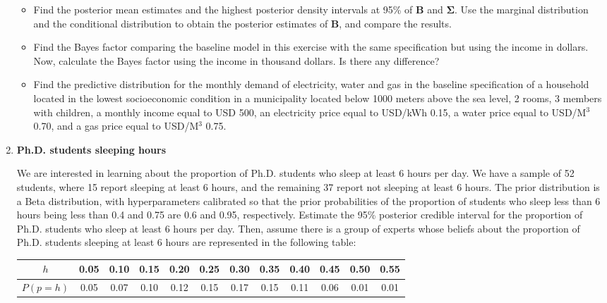 \begin{enumerate}
\begin{itemize}
	\item Find the posterior mean estimates and the highest posterior density intervals at 95\% of $\bm{B}$ and $\bm{\Sigma}$. Use the marginal distribution and the conditional distribution to obtain the posterior estimates of  $\bm{B}$, and compare the results.
	\item Find the Bayes factor comparing the baseline model in this exercise with the same specification but using the income in dollars. Now, calculate the Bayes factor using the income in thousand dollars. Is there any difference?
	\item Find the predictive distribution for the monthly demand of electricity, water and gas in the baseline specification of a household located in the lowest socioeconomic condition in a municipality located below 1000 meters above the sea level, 2 rooms, 3 members with children, a monthly income equal to USD 500, an electricity price equal to USD/kWh 0.15, a water price equal to USD/M$^3$ 0.70, and a gas price equal to USD/M$^3$ 0.75. 
\end{itemize} 

\item \textbf{Ph.D. students sleeping hours \cite[Chap.~2]{albert2009bayesian}}

We are interested in learning about the proportion of Ph.D. students who sleep at least 6 hours per day. We have a sample of 52 students, where 15 report sleeping at least 6 hours, and the remaining 37 report not sleeping at least 6 hours. The prior distribution is a Beta distribution, with hyperparameters calibrated so that the prior probabilities of the proportion of students who sleep less than 6 hours being less than 0.4 and 0.75 are 0.6 and 0.95, respectively. Estimate the 95\% posterior credible interval for the proportion of Ph.D. students who sleep at least 6 hours per day. Then, assume there is a group of experts whose beliefs about the proportion of Ph.D. students sleeping at least 6 hours are represented in the following table:

\begin{table}[!htbp]%
	\label{tab:sleep}%
	\begin{tabular}{cccccccccccc}
		$h$   & 0.05 & 0.10 & 0.15 & 0.20 & 0.25 & 0.30 & 0.35 & 0.40 & 0.45 & 0.50 & 0.55  \\
		\hline
		$P(p=h)$ & 0.05 & 0.07 & 0.10 & 0.12 & 0.15 & 0.17 & 0.15 & 0.11 & 0.06 & 0.01 & 0.01 \\ 


\end{tabular}
\end{table}
\end{enumerate}
